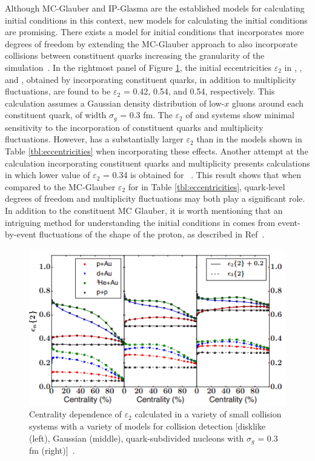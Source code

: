 Although MC-Glauber and IP-Glasma are the established models for calculating initial conditions in this context, new models for calculating the initial conditions are promising. There exists a model for initial conditions that incorporates more degrees of freedom by extending the MC-Glauber approach to also incorporate collisions between constituent quarks increasing the granularity of the simulation~\cite{PhysRevC.67.064905}. In the rightmost panel of Figure \ref{fig:epsilon_2_theory}, the initial eccentricities $\varepsilon_2$ in \pau, \dau, and \hau, obtained by incorporating constituent quarks, in addition to multiplicity fluctuations, are found to be $\varepsilon_2$ = 0.42, 0.54, and 0.54, respectively. This calculation assumes a Gaussian density distribution of low-$x$ gluons around each constituent quark, of width $\sigma_g$ = 0.3 fm. The $\varepsilon_2$ of \dau and \hau systems show minimal sensitivity to the incorporation of constituent quarks and multiplicity fluctuations. However, \pau has a substantially larger $\varepsilon_2$ than in the models shown in Table \ref{tbl:eccentricities} when incorporating these effects. Another attempt at the calculation incorporating constituent quarks and multiplicity presents calculations in which lower value of $\varepsilon_2$ = 0.34 is obtained for \pau ~\cite{PhysRevC.94.024919}. This result shows that when compared to the MC-Glauber $\varepsilon_2$ for \pau in Table \ref{tbl:eccentricities}, quark-level degrees of freedom and multiplicity fluctuations may both play a significant role. In addition to the constituent MC Glauber, it is worth mentioning that an intriguing method for understanding the initial conditions in \pau comes from event-by-event fluctuations of the shape of the proton, as described in Ref~\cite{Schlichting2014313}. 

\begin{figure}[!ht]
\begin{center}
\includegraphics[width=0.65\linewidth]{figs/theoretical_epsilon_values.png}
\caption{Centrality dependence of $\varepsilon_2$ calculated in a variety of small collision systems with a variety of models for collision detection [disklike (left), Gaussian (middle), quark-subdivided nucleons with $\sigma_g$ = 0.3 fm (right)]~\cite{PhysRevC.94.024919}.}
\label{fig:epsilon_2_theory}
\end{center}
\end{figure}

